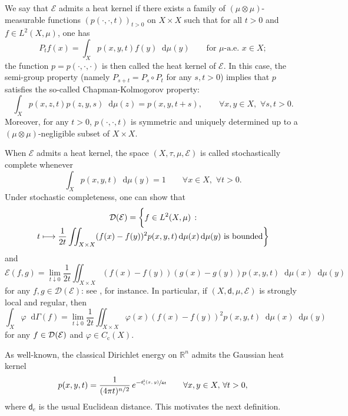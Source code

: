 \documentclass[JEP,XML,SOM,Unicode,published]{cedram}
\newcommand\mto{\mathchoice{\longmapsto}{\mapsto}{\mapsto}{\mapsto}}
\newcommand{\rmc}{\mathrm{c}}
\newcommand{\NoChangel}[1]{%
\expandafter\let\csname old\string#1\endcsname=#1
\let#1=\relax
\newcommand{#1}{\mathcode`l="716C\csname old\string#1\endcsname\mathcode`l="7160 }%
}
\theoremstyle{plain}
\theoremstyle{definition}
\newcommand{\setR}{\mathbb{R}}
\newcommand{\cE}{\mathcal{E}}
\newcommand{\cD}{\mathcal{D}}
\let\phi\varphi
\newcommand{\di}{\mathop{}\!\mathrm{d}}
\newcommand{\loc}{\mathrm{loc}}\NoChangel{\loc}
\newcommand{\dist}{\mathsf{d}}
\begin{document}
We say that $\cE$ admits a heat kernel if there exists a family of $(\mu \otimes \mu)$-measurable functions $(p(\cdot, \cdot, t))_{t>0}$ on $X\times X$ such that for all $t>0$ and $f\in L^2(X,\mu)$, one has
\[
P_t f (x) = \int_X p(x,y,t) f(y) \di \mu(y) \qquad \text{for $\mu$-a.e.\ $x \in X$};
\]
the function $p=p(\cdot,\cdot,\cdot)$ is then called the heat kernel of $\cE$.
In this case, the semi-group property (namely $P_{s+t}=P_s \circ P_t$ for any $s,t>0$) implies that $p$ satisfies the so-called Chapman-Kolmogorov property:
\begin{equation}\label{eq:ChapmanKolmogorov}
\int_X p(x,z,t)p(z,y,s) \di \mu(z) = p(x,y,t+s), \qquad \forall x,y \in X, \, \, \forall s,t>0.
\end{equation}
Moreover, for any $t>0$, $p(\cdot,\cdot,t)$ is symmetric and uniquely determined up to a $(\mu\otimes \mu)$-negligible subset of $X\times X$.

When $\cE$ admits a heat kernel, the space $(X,\tau,\mu,\cE)$ is called stochastically complete whenever\vspace*{-3pt}
\[
\int_X p(x,y,t) \di \mu(y) = 1 \qquad \forall x \in X,\, \, \forall t >0.
\]
Under stochastic completeness, one can show that\vspace*{-4pt}
\begin{multline}\label{eq:Grigoryan}
\cD(\cE)= \biggl\{f \in L^2(X,\mu) \,: \\[-5pt]
t \mto \frac{1}{2t} \iint_{X\times X} (f(x)-f(y))^2 p(x,y,t) \di \mu(x) \di \mu(y) \, \, \text{is bounded} \biggr\}
\end{multline}
and\vspace*{-3pt}
\[
\cE(f,g) = \lim_{t \downarrow 0} \frac{1}{2t} \iint_{X\times X} (f(x)-f(y))(g(x)-g(y)) p(x,y,t) \di \mu(x) \di \mu(y)
\]
for any $f, g \in \cD(\cE)$: see \cite[2.2]{Grigor'yan}, for instance. In particular, if $(X,\dist,\mu,\cE)$ is strongly local and regular, then
\begin{equation}\label{eq:Grigor'yan2}
\int_X \phi \di \Gamma(f) = \lim_{t \downarrow 0} \frac{1}{2t} \iint_{X\times X} \phi(x)(f(x)-f(y))^2 p(x,y,t) \di \mu(x) \di \mu(y)
\end{equation}
for any $f \in \cD_{\loc}(\cE)$ and $\phi \in C_\rmc(X)$.

As well-known, the classical Dirichlet energy on $\setR^n$ admits the Gaussian heat kernel
\[
p(x,y,t) = \frac{1}{(4 \pi t)^{n/2}}\, e^{-\sfrac{\dist_e^2(x,y)}{4t}} \qquad \forall x,y \in X, \, \forall t >0,
\]
where $\dist_e$ is the usual Euclidean distance. This motivates the next definition.
\end{document}
